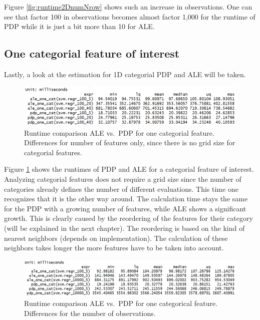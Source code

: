\documentclass[
]{krantz}
\begin{document}
Figure \ref{fig:runtime2DnumNrow} shows such an increase in observations. One can see that factor 100 in observations becomes almost factor 1,000 for the runtime of PDP while it is just a bit more than 10 for ALE.

\hypertarget{one-categorial-feature-of-interest}{%
\subsection{One categorial feature of interest}\label{one-categorial-feature-of-interest}}

Lastly, a look at the estimation for 1D categorial PDP and ALE will be taken.

\begin{figure}
\includegraphics[width=1\linewidth]{images/ale_1_one_cat_cols_and_gridsize} \caption{Runtime comparison ALE vs.~PDP for one categorial feature. Differences for number of features only, since there is no grid size for categorial features.}\label{fig:runtime1DcatColAndSize}
\end{figure}



Figure \ref{fig:runtime1DcatColAndSize} shows the runtimes of PDP and ALE for a categorial feature of interest. Analyzing categorial features does not require a grid size since the number of categories already defines the number of different evaluations. This time one recognizes that it is the other way around. The calculation time stays the same for the PDP with a growing number of features, while ALE shows a significant growth. This is clearly caused by the reordering of the features for their category (will be explained in the next chapter). The reordering is based on the kind of nearest neighbors (depends on implementation). The calculation of these neighbors takes longer the more features have to be taken into account.

\begin{figure}
\includegraphics[width=1\linewidth]{images/ale_1_one_cat_nrows} \caption{Runtime comparison ALE vs.~PDP for one categorical feature. Differences for the number of observations.}\label{fig:runtime1DcatNrow}
\end{figure}
\end{document}

